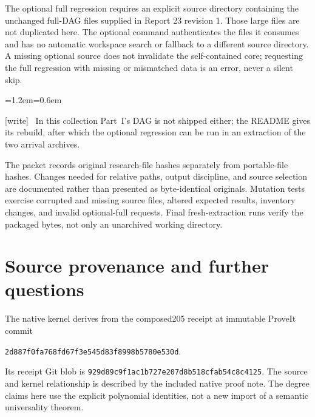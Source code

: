 \documentclass[11pt,letterpaper]{article}
\theoremstyle{definition}\newtheorem{definition}[theorem]{Definition}
\theoremstyle{remark}\newtheorem{remark}[theorem]{Remark}
\newcommand{\wtag}{\textup{[write]}}
\newenvironment{writenote}{\par\smallskip\begin{list}{}{\leftmargin=1.2em\rightmargin=0.6em}\item[]\small\wtag\ }{\end{list}\smallskip}
\begin{document}
The optional full regression requires an explicit source directory containing the unchanged full-DAG files supplied in Report 23 revision 1. Those large files are not duplicated here. The optional command authenticates the files it consumes and has no automatic workspace search or fallback to a different source directory. A missing optional source does not invalidate the self-contained core; requesting the full regression with missing or mismatched data is an error, never a silent skip.
\begin{writenote}
In this collection Part~I's DAG is not shipped either; the README gives its rebuild, after which the optional regression can be run in an extraction of the two arrival archives.
\end{writenote}

The packet records original research-file hashes separately from portable-file hashes. Changes needed for relative paths, output discipline, and source selection are documented rather than presented as byte-identical originals. Mutation tests exercise corrupted and missing source files, altered expected results, inventory changes, and invalid optional-full requests. Final fresh-extraction runs verify the packaged bytes, not only an unarchived working directory.

\section{Source provenance and further questions}\label{fup:dl:sec:provenance}
The native kernel derives from the composed205 receipt at immutable ProveIt commit
\begin{center}\texttt{2d887f0fa768fd67f3e545d83f8998b5780e530d}.\end{center}
Its receipt Git blob is \texttt{929d89c9f1ac1b727e207d8b518cfab54c8c4125}. The source and kernel relationship is described by the included native proof note. The degree claims here use the explicit polynomial identities, not a new import of a semantic universality theorem.
\end{document}
